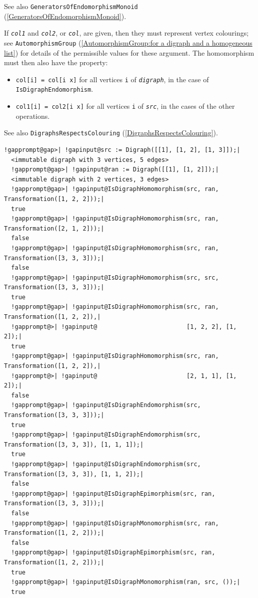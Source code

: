 \documentclass[a4paper,11pt]{report}
\begin{document}
{{{ See also \texttt{GeneratorsOfEndomorphismMonoid} (\ref{GeneratorsOfEndomorphismMonoid}).

 If \mbox{\texttt{\mdseries\slshape col1}} and \mbox{\texttt{\mdseries\slshape col2}}, or \mbox{\texttt{\mdseries\slshape col}}, are given, then they must represent vertex colourings; see \texttt{AutomorphismGroup} (\ref{AutomorphismGroup:for a digraph and a homogeneous list}) for details of the permissible values for these argument. The homomorphism
must then also have the property: 
\begin{itemize}
\item  \texttt{col[i] = col[i \texttt{} x]} for all vertices \texttt{i} of \mbox{\texttt{\mdseries\slshape digraph}}, in the case of \texttt{IsDigraphEndomorphism}.
\item  \texttt{col1[i] = col2[i \texttt{} x]} for all vertices \texttt{i} of \mbox{\texttt{\mdseries\slshape src}}, in the cases of the other operations.
\end{itemize}
 See also \texttt{DigraphsRespectsColouring} (\ref{DigraphsRespectsColouring}). 
\begin{Verbatim}[commandchars=!@|,fontsize=\small,frame=single,label=Example]
  !gapprompt@gap>| !gapinput@src := Digraph([[1], [1, 2], [1, 3]]);|
  <immutable digraph with 3 vertices, 5 edges>
  !gapprompt@gap>| !gapinput@ran := Digraph([[1], [1, 2]]);|
  <immutable digraph with 2 vertices, 3 edges>
  !gapprompt@gap>| !gapinput@IsDigraphHomomorphism(src, ran, Transformation([1, 2, 2]));|
  true
  !gapprompt@gap>| !gapinput@IsDigraphHomomorphism(src, ran, Transformation([2, 1, 2]));|
  false
  !gapprompt@gap>| !gapinput@IsDigraphHomomorphism(src, ran, Transformation([3, 3, 3]));|
  false
  !gapprompt@gap>| !gapinput@IsDigraphHomomorphism(src, src, Transformation([3, 3, 3]));|
  true
  !gapprompt@gap>| !gapinput@IsDigraphHomomorphism(src, ran, Transformation([1, 2, 2]),|
  !gapprompt@>| !gapinput@                         [1, 2, 2], [1, 2]);|
  true
  !gapprompt@gap>| !gapinput@IsDigraphHomomorphism(src, ran, Transformation([1, 2, 2]),|
  !gapprompt@>| !gapinput@                         [2, 1, 1], [1, 2]);|
  false
  !gapprompt@gap>| !gapinput@IsDigraphEndomorphism(src, Transformation([3, 3, 3]));|
  true
  !gapprompt@gap>| !gapinput@IsDigraphEndomorphism(src, Transformation([3, 3, 3]), [1, 1, 1]);|
  true
  !gapprompt@gap>| !gapinput@IsDigraphEndomorphism(src, Transformation([3, 3, 3]), [1, 1, 2]);|
  false
  !gapprompt@gap>| !gapinput@IsDigraphEpimorphism(src, ran, Transformation([3, 3, 3]));|
  false
  !gapprompt@gap>| !gapinput@IsDigraphMonomorphism(src, ran, Transformation([1, 2, 2]));|
  false
  !gapprompt@gap>| !gapinput@IsDigraphEpimorphism(src, ran, Transformation([1, 2, 2]));|
  true
  !gapprompt@gap>| !gapinput@IsDigraphMonomorphism(ran, src, ());|
  true
\end{Verbatim}
 }

}}
\end{document}
